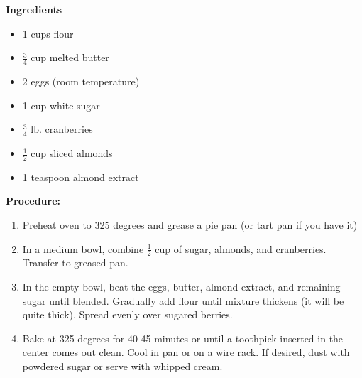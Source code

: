 \begin{multicols}{2}
\textbf{Ingredients}
\begin{itemize}
\item 1 cups flour
\item $\frac{3}{4}$ cup melted butter 
\item 2 eggs (room temperature) 
\item 1 cup white sugar
\item $\frac{3}{4}$ lb. cranberries 
\item $\frac{1}{2}$ cup sliced almonds
\item 1 teaspoon almond extract 




\end{itemize}


\columnbreak
\textbf{Procedure:}
\medskip


\begin{enumerate}
\item Preheat oven to 325 degrees and grease a pie pan (or tart pan if you have it)


\medskip
\item In a medium bowl, combine $\frac{1}{2}$ cup of sugar, almonds, and cranberries. Transfer to greased pan.  
\medskip

\item In the empty bowl, beat the eggs, butter, almond extract, and remaining sugar until blended. Gradually add flour until mixture thickens (it will be quite thick). Spread evenly over sugared berries. 
\newline 

 \item Bake at 325 degrees for 40-45 minutes or until a toothpick inserted in the center comes out clean. Cool in pan or on a wire rack. If desired, dust with powdered sugar or serve with whipped cream. 
\end{enumerate}

\end{multicols}

